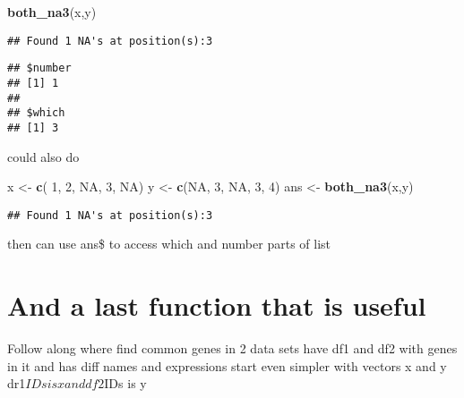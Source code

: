 \documentclass[]{article}
\newenvironment{Shaded}{\begin{snugshade}}{\end{snugshade}}
\newcommand{\KeywordTok}[1]{\textcolor[rgb]{0.13,0.29,0.53}{\textbf{#1}}}
\newcommand{\DecValTok}[1]{\textcolor[rgb]{0.00,0.00,0.81}{#1}}
\newcommand{\StringTok}[1]{\textcolor[rgb]{0.31,0.60,0.02}{#1}}
\newcommand{\OtherTok}[1]{\textcolor[rgb]{0.56,0.35,0.01}{#1}}
\newcommand{\OperatorTok}[1]{\textcolor[rgb]{0.81,0.36,0.00}{\textbf{#1}}}
\newcommand{\NormalTok}[1]{#1}
\begin{document}
\begin{Shaded}
\begin{Highlighting}[]
\KeywordTok{both_na3}\NormalTok{(x,y)}
\end{Highlighting}
\end{Shaded}

\begin{verbatim}
## Found 1 NA's at position(s):3
\end{verbatim}

\begin{verbatim}
## $number
## [1] 1
## 
## $which
## [1] 3
\end{verbatim}

could also do

\begin{Shaded}
\begin{Highlighting}[]
\NormalTok{x <-}\StringTok{ }\KeywordTok{c}\NormalTok{( }\DecValTok{1}\NormalTok{, }\DecValTok{2}\NormalTok{, }\OtherTok{NA}\NormalTok{, }\DecValTok{3}\NormalTok{, }\OtherTok{NA}\NormalTok{)}
\NormalTok{y <-}\StringTok{ }\KeywordTok{c}\NormalTok{(}\OtherTok{NA}\NormalTok{, }\DecValTok{3}\NormalTok{, }\OtherTok{NA}\NormalTok{, }\DecValTok{3}\NormalTok{, }\DecValTok{4}\NormalTok{)}
\NormalTok{ans <-}\StringTok{ }\KeywordTok{both_na3}\NormalTok{(x,y)}
\end{Highlighting}
\end{Shaded}

\begin{verbatim}
## Found 1 NA's at position(s):3
\end{verbatim}

then can use ans\$ to access which and number parts of list

\section{And a last function that is
useful}\label{and-a-last-function-that-is-useful}

Follow along where find common genes in 2 data sets have df1 and df2
with genes in it and has diff names and expressions start even simpler
with vectors x and y dr1\(IDs is x and df2\)IDs is y

\begin{Shaded}
\end{Shaded}
\end{document}
